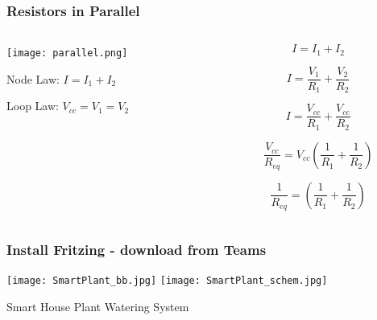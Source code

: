 \documentclass{beamer}
\begin{document}
\begin{frame}\frametitle{Resistors in Parallel}
\begin{columns}
\begin{column}{5cm}
\begin{center}
\texttt{[image: parallel.png]}

\vspace{0.5cm}

Node Law: $I = I_1 + I_2$

\vspace{0.2cm}


Loop Law: $V_{cc} = V_1 = V_2$

\end{center}
\end{column}
\begin{column}{5cm}

\begin{equation}
I = I_1 + I_2
\end{equation}

\begin{equation}
I = \frac{V_1}{R_1} + \frac{V_2}{R_2}
\end{equation}

\begin{equation}
I = \frac{V_{cc}}{R_1} + \frac{V_{cc}}{R_2}
\end{equation}

\begin{equation}
\frac{V_{cc}}{R_{eq}} = V_{cc} (\frac{1}{R_1} + \frac{1}{R_2})
\end{equation}

\begin{equation}
\boxed{\frac{1}{R_{eq}} = (\frac{1}{R_1} + \frac{1}{R_2})}
\end{equation}
\end{column}
\end{columns}
\end{frame}

\begin{frame}
\frametitle{Install Fritzing - download from Teams}
\begin{center}
\texttt{[image: SmartPlant\_bb.jpg]} 
\texttt{[image: SmartPlant\_schem.jpg]}

\vspace{1cm}

Smart House Plant Watering System

\end{center}
\end{frame}
\end{document}
